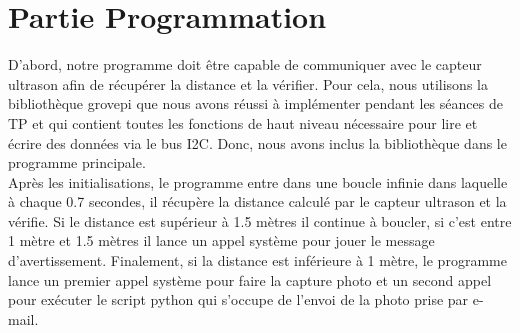 \section{Partie Programmation} 
D'abord, notre programme doit être capable de communiquer avec le capteur ultrason afin de récupérer la distance et la vérifier. Pour cela, nous utilisons la bibliothèque grovepi que nous avons réussi à implémenter pendant les séances de TP et qui contient toutes les fonctions de haut niveau nécessaire pour lire et écrire des données via le bus I2C. Donc, nous avons inclus la bibliothèque dans le programme principale.\\
Après les initialisations, le programme entre dans une boucle infinie dans laquelle à chaque 0.7 secondes, il récupère la distance calculé par le capteur ultrason et la vérifie. Si le distance est supérieur à 1.5 mètres il continue à boucler, si c'est entre 1 mètre et 1.5 mètres il lance un appel système pour jouer le message d'avertissement.
Finalement, si la distance est inférieure à 1 mètre, le programme lance un premier appel système pour faire la capture photo et un second appel pour exécuter le script python qui s'occupe de l'envoi  de la photo prise par e-mail. 